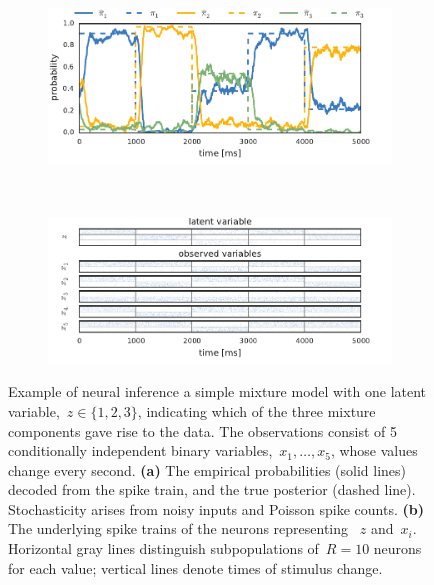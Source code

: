 \begin{figure}[t!]
  \centering
  \begin{subfigure}[b]{5.5in}
   \centering
   \caption{}
   \vspace{-.3in}
   \includegraphics[width=\textwidth]{figures/ch7/neural_mixture_probs}
   \label{fig:mixture_probs}
 \end{subfigure} \\
 \begin{subfigure}[b]{5.5in}
   \centering
   \caption{}
   \vspace{-.4in}
   \includegraphics[width=\textwidth]{figures/ch7/neural_mixture_spiketrains}
   \label{fig:mixture_spiketrains}
 \end{subfigure}
 \vspace{-.3in}
 \caption[Demo of neural inference in a simple mixture model]
         {Example of neural inference  a simple mixture model with one
           latent variable,~$z \in \{1, 2, 3\}$, indicating which of the
           three mixture components gave rise to the data. The observations
           consist of 5 conditionally independent binary
           variables,~$x_1, \ldots, x_5$, whose values change every second. 
           \textbf{(a)} The empirical probabilities (solid lines) decoded
           from the spike train, and the true posterior (dashed line).
           Stochasticity arises from noisy inputs and Poisson spike counts.
           \textbf{(b)} The underlying spike trains of the neurons representing
           ~$z$ and~$x_i$. Horizontal gray lines distinguish subpopulations of~$R=10$ neurons for
           each value; vertical lines denote times of stimulus change.
 }
 \label{fig:mixture}
\end{figure}


